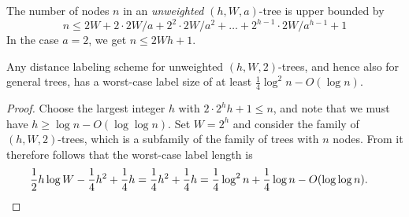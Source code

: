 The number of nodes $n$ in an \emph{unweighted} $(h,W,a)$-tree is upper bounded by
\[
n\leq  2W+2\cdot 2W/a + 2^2\cdot 2W/a^2 + \dots + 2^{h-1}\cdot 2W/a^{h-1} +1
\]
In the case $a=2$, we get $n \leq 2Wh+1$.

\begin{theorem} \label{theo:distancelowerbintrees}
Any distance labeling scheme for unweighted $(h,W,2)$-trees, and hence also for general trees, has a worst-case label size of at least $\frac{1}{4}\log^2 n-O(\log n)$.
\end{theorem}
\begin{proof}
Choose the largest integer $h$ with $2\cdot 2^hh+1\leq n$, and note that we must have $h\geq \log n-O(\log\log n)$.  Set $W=2^h$ and consider the family of  $(h,W,2)$-trees, which is a subfamily of the family of trees with $n$ nodes. From  it therefore follows that the worst-case label length is
\begin{align*}
\frac{1}{2}h\log W-\frac{1}{4}h^2+\frac{1}{4}h &= \frac{1}{4}h^2 +\frac{1}{4}h 
 = \frac{1}{4}\log^2 n + \frac{1}{4}\log n -O(\log\log  n). \qedhere
\end{align*}
\end{proof}
